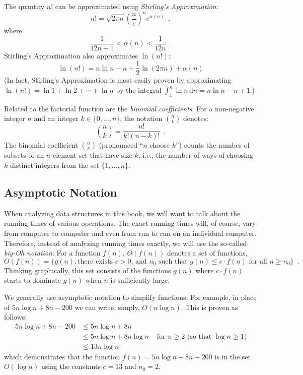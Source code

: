 The quantity $n!$ can be approximated using \emph{Stirling's Approximation}:
\[
	n! 
   = \sqrt{2\pi n}\left(\frac{n}{e}\right)^{n}e^{\alpha(n)} \enspace ,
\]
where
\[  
   \frac{1}{12n+1} <  \alpha(n) < \frac{1}{12n}  \enspace .
\]
Stirling's Approximation also approximates $\ln(n!)$:
\[
   \ln(n!) = n\ln n - n + \frac{1}{2}\ln(2\pi n) + \alpha(n)
\]
(In fact, Stirling's Approximation is most easily proven by approximating
$\ln(n!)=\ln 1 + \ln 2  + \cdots + \ln n$ by the integral
$\int_1^n \ln n\,\mathrm{d}n = n\ln n - n +1$.)

Related to the factorial function are the \emph{binomial coefficients}.
For a non-negative integer $n$ and an integer $k\in\{0,\ldots,n\}$,
the notation $\binom{n}{k}$ denotes:
\[
   \binom{n}{k} = \frac{n!}{k!(n-k)!} \enspace .
\]
The binomial coefficient $\binom{n}{k}$ (pronounced ``$n$ choose $k$'')
counts the number of subsets of an $n$ element set that have size $k$,
i.e., the number of ways of choosing $k$ distinct integers from the
set $\{1,\ldots,n\}$.

\subsection{Asymptotic Notation}

When analyzing data structures in this book, we will want to talk about
the running times of various operations.  The exact running times will,
of course, vary from computer to computer and even from run to run on
an individual computer.  Therefore, instead of analyzing running times
exactly, we will use the so-called \emph{big-Oh notation}: For a 
function $f(n)$, $O(f(n))$ denotes a set of functions,
\[
   O(f(n)) = \{g(n):\mbox{there exists $c>0$, and $n_0$ such that
             $g(n) \le c\cdot f(n)$ for all $n\ge n_0$}   \} \enspace .
\]
Thinking graphically, this set consists of the functions $g(n)$ where
$c\cdot f(n)$ starts to dominate $g(n)$ when $n$ is sufficiently large.

We generally use asymptotic notation to simplify functions.  For example,
in place of $5n\log n + 8n - 200$ we can write, simply,  $O(n\log n)$.
This is proven as follows:
\begin{align*} 
       5n\log n + 8n - 200
        & \le 5n\log n + 8n \\
        & \le 5n\log n + 8n\log n & \mbox{ for $n\ge 2$ (so that $\log n \ge 1$)}
            \\
        & \le 13n\log n 
\end{align*}
which demonstrates that the function $f(n)=5n\log n + 8n - 200$ is in the set $O(\log n)$ using the constants $c=13$ and $n_0 = 2$.

